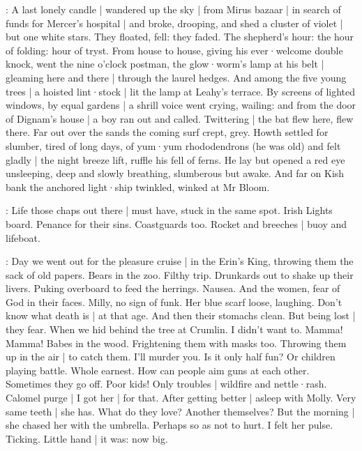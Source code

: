 \Nnovel:
A last lonely candle |
wandered up the sky |
from Mirus bazaar |
in search of funds for Mercer's hospital |
and broke,
drooping,
and shed a cluster of violet |
but one white stars.
They floated,
fell:
they faded.
The shepherd's hour:
the hour of folding:
hour of tryst.
From house to house,
giving his ever·welcome double knock,%
went the nine o'clock postman,
the glow·worm's lamp at his belt |
gleaming here and there |
through the laurel hedges.
And among the five young trees |
a hoisted lint·stock |
lit the lamp at Leahy's terrace.
By screens of lighted windows,
by equal gardens |
a shrill voice went crying,
wailing:
and from the door of Dignam's house |
a boy ran out and called.
Twittering |
the bat flew here,
flew there.
Far out over the sands
the coming surf crept,
grey.
Howth settled for slumber,
tired of long days,
of yum·yum rhododendrons
(he was old)
and felt gladly |
the night breeze lift,
ruffle his fell of ferns.
He lay
but opened a red eye
unsleeping,
deep and slowly breathing,
slumberous but awake.%
And far on Kish bank
the anchored light·ship twinkled,
winked at Mr Bloom.

\BloomAbstract:
Life those chaps out there |
must have,
stuck in the same spot.
Irish Lights board.
Penance for their sins.
Coastguards too.
Rocket and breeches |
buoy and lifeboat.

\BloomHist:
Day we went out for the pleasure cruise |
in the Erin's King,
throwing them the sack of old papers.
Bears in the zoo.
Filthy trip.
Drunkards out to shake up their livers.
Puking overboard to feed the herrings.
Nausea.
And the women,
fear of God in their faces.
Milly,
no sign of funk.
Her blue scarf loose,
laughing.
Don't know what death is |
at that age.
And then their stomachs clean.
But being lost |
they fear.
When we hid behind the tree at Crumlin.%
I didn't want to.
Mamma!
Mamma!
Babes in the wood.
Frightening them with masks too.
Throwing them up in the air |
to catch them.
I'll murder you.
Is it only half fun?
Or children playing battle.
Whole earnest.
How can people aim guns at each other.
Sometimes they go off.
Poor kids!
Only troubles |
wildfire and nettle·rash.
Calomel purge |
I got her |
for that.
After getting better |
asleep with Molly.
Very same teeth |
she has.
What do they love?
Another themselves?
But the morning |
she chased her with the umbrella.
Perhaps so as not to hurt.
I felt her pulse.
Ticking.
Little hand |
it was:
now big.


